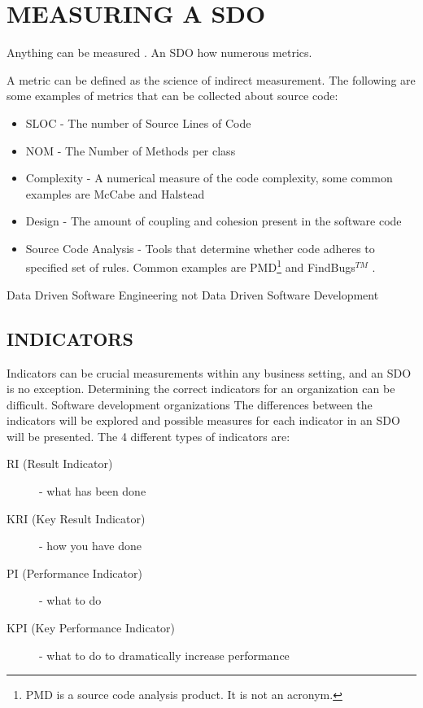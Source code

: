 \documentclass[SDSUThesis.tex]{subfiles}
\begin{document}
\section{MEASURING A SDO}

Anything can be measured \cite{Hubbard2010}.  An SDO
how numerous metrics.

A metric can be defined as the science of indirect measurement.
    The following are some examples of metrics that can be collected 
    about source code:
    \begin{itemize}
        \item SLOC - The number of Source Lines of Code 
        \item NOM - The Number of Methods per class
        \item Complexity - A numerical measure of the code complexity,
            some common examples are McCabe \cite{McCabe1976} and 
            Halstead \cite{Halstead1977}
        \item Design - The amount of coupling and cohesion present 
        in the software code
        \item Source Code Analysis - Tools that determine whether 
        code adheres to specified set of rules. Common 
        examples are PMD\footnote{PMD is a source code analysis product.  It is not an acronym.} and FindBugs$^{TM}$ \cite{PMD, Findbugs}.
    \end{itemize}

Data Driven Software Engineering not Data Driven Software Development


\subsection{INDICATORS}
Indicators can be crucial measurements
within any business setting, and an SDO is no exception. Determining
the correct indicators for an organization can
be difficult.  Software development organizations
The differences between the indicators will be explored and
possible measures for each indicator in an SDO will be
presented.  The 4 different types of indicators are:
\begin{description}
  \item[RI (Result Indicator)] - what has been done
  \item[KRI (Key Result Indicator)] - how you have done
  \item[PI (Performance Indicator)] - what to do
  \item[KPI (Key Performance Indicator)] - what to do to dramatically increase performance
\end{description}
\end{document}
